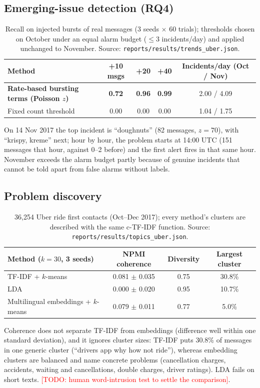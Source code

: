 \documentclass[11pt,a4paper]{article}
\newcommand{\todo}[1]{\textcolor{red}{[TODO: #1]}}
\newcommand{\res}[1]{\texttt{\small reports/results/#1}}
\begin{document}
\subsection{Emerging-issue detection (RQ4)}
\begin{table}[h]
\centering\small
\begin{tabular}{lcccc}
\toprule
Method & +10 msgs & +20 & +40 & Incidents/day (Oct / Nov) \\
\midrule
\textbf{Rate-based bursting terms (Poisson $z$)} & \textbf{0.72} & \textbf{0.96} & \textbf{0.99} & 2.00 / 4.09 \\
Fixed count threshold & 0.00 & 0.00 & 0.00 & 1.04 / 1.75 \\
\bottomrule
\end{tabular}
\caption{Recall on injected bursts of real messages (3 seeds $\times$ 60 trials); thresholds chosen on
October under an equal alarm budget ($\leq 3$ incidents/day) and applied unchanged to November.
Source: \res{trends\_uber.json}.}
\end{table}
On 14 Nov 2017 the top incident is ``doughnuts'' (82 messages, $z=70$), with ``krispy, kreme'' next;
hour by hour, the problem starts at 14:00 UTC (151 messages that hour, against 0--2 before) and the
first alert fires in that same hour. November
exceeds the alarm budget partly because of genuine incidents that cannot be told apart from false
alarms without labels.

\subsection{Problem discovery}
\begin{table}[h]
\centering\small
\begin{tabular}{lccc}
\toprule
Method ($k=30$, 3 seeds) & NPMI coherence & Diversity & Largest cluster \\
\midrule
TF-IDF + $k$-means & 0.081 $\pm$ 0.035 & 0.75 & 30.8\% \\
LDA & 0.000 $\pm$ 0.020 & 0.95 & 10.7\% \\
Multilingual embeddings + $k$-means & 0.079 $\pm$ 0.011 & 0.77 & 5.0\% \\
\bottomrule
\end{tabular}
\caption{36{,}254 Uber ride first contacts (Oct--Dec 2017); every method's clusters are described
with the same c-TF-IDF function. Source: \res{topics\_uber.json}.}
\end{table}
Coherence does not separate TF-IDF from embeddings (difference well within one standard deviation),
and it ignores cluster sizes: TF-IDF puts 30.8\% of messages in one generic cluster (``drivers app
why how not ride''), whereas embedding clusters are balanced and name concrete problems
(cancellation charges, accidents, waiting and cancellations, double charges, driver ratings). LDA fails
on short texts. \todo{human word-intrusion test to settle the comparison}.
\end{document}
